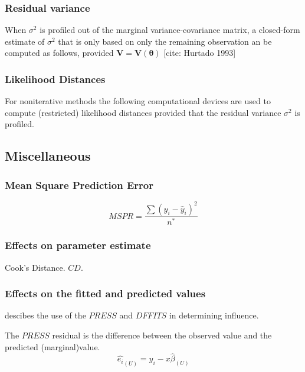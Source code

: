 \documentclass[12pt, a4paper]{report}
\theoremstyle{plain}
\theoremstyle{definition}
\theoremstyle{remark}
\begin{document}
\subsubsection{Residual variance}
When $\sigma^2$ is profiled out of the marginal variance-covariance matrix, a closed-form estimate of $\sigma^2$ that is only based on only the remaining observation
an be computed as follows, provided $\boldsymbol{V} = \boldsymbol{V}(\boldsymbol{\theta}) $
[cite: Hurtado 1993]

\subsubsection{Likelihood Distances}
For noniterative methods the following computational devices are used to compute (restricted) likelihood distances provided that the residual variance
$\sigma^2$ is profiled.
\subsection{Miscellaneous}


\subsubsection{Mean Square Prediction Error}
\begin{equation}
MSPR = \frac{\sum (y_{i}-\hat{y}_{i})^2}{n^*}
\end{equation}


\subsubsection{Effects on parameter estimate}
Cook's Distance. $CD$.

\subsubsection{Effects on the fitted and predicted values}
\citet{schabenberger} descibes the use of the $PRESS$ and $DFFITS$ in determining influence.

The $PRESS$ residual is the difference between the observed value and the predicted (marginal)value.
\begin{equation}
\hat{e_{i}}_{(U)} = y_{i} - x\hat{\beta}_{(U)}
\end{equation}
\end{document}
